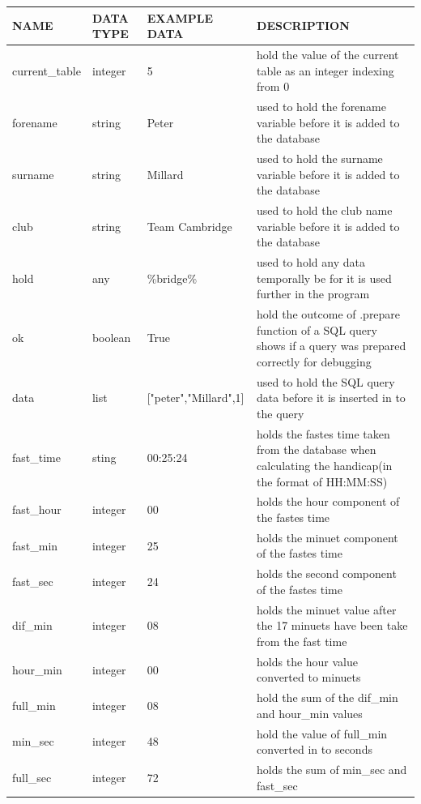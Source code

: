 \begin{tabular}{|l|l|l|p{4cm}|}
	\hline
	NAME           & DATA TYPE & EXAMPLE DATA & DESCRIPTION                                                       \\ \hline
	current\_table & integer   & 5            & hold the value of the current table as an integer indexing from 0 \\ \hline
	forename & string & Peter & used to hold the forename variable before it is added to the database \\\hline
	surname & string & Millard & used to hold the surname variable before it is added to the database\\\hline
	club &  string & Team Cambridge & used to hold the club name variable before it is added to the database\\\hline
	hold & any & \%bridge\% & used to hold any data temporally be for it is used further in the program \\\hline
	ok & boolean & True & hold the outcome of .prepare function of a SQL query shows if a query was prepared correctly for debugging \\\hline
	data & list & ["peter","Millard",1] & used to hold the SQL query data before it is inserted in to the query \\\hline
	fast\_time & sting & 00:25:24 & holds the fastes time taken from the database when calculating the handicap(in the format of HH:MM:SS) \\\hline
	fast\_hour & integer & 00 & holds the hour component of the fastes time \\\hline
	fast\_min & integer & 25 & holds the minuet component of the fastes time \\\hline
	fast\_sec & integer & 24 & holds the second component of the fastes time \\\hline
	dif\_min & integer & 08 & holds the minuet value after the 17 minuets have been take from the fast time \\\hline
	hour\_min & integer & 00 & holds the hour value converted to minuets \\\hline
	full\_min & integer & 08 & hold the sum of the dif\_min and hour\_min values \\\hline
	min\_sec & integer & 48 & hold the value of full\_min converted in to seconds \\\hline
	full\_sec & integer & 72 & holds the sum of min\_sec and fast\_sec \\\hline
\end{tabular}

